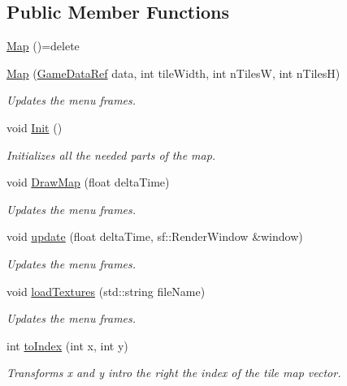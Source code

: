 \subsection*{Public Member Functions}
\begin{DoxyCompactItemize}
\item 
\mbox{\hyperlink{classMap_a7c19436c39c47715bee04c9a2390ac27}{Map}} ()=delete
\item 
\mbox{\hyperlink{classMap_a09823ddb7b00abc80dc72a4583469c58}{Map}} (\mbox{\hyperlink{Game_8h_aff850703a7797c8bfee2f02906aec50c}{Game\+Data\+Ref}} data, int tile\+Width, int n\+TilesW, int n\+TilesH)
\begin{DoxyCompactList}\small\item\em Updates the menu frames. \end{DoxyCompactList}\item 
void \mbox{\hyperlink{classMap_a67b222c575eee96246c2f3fd25b4912c}{Init}} ()
\begin{DoxyCompactList}\small\item\em Initializes all the needed parts of the map. \end{DoxyCompactList}\item 
void \mbox{\hyperlink{classMap_a3d0c3cf82f949ab01c788ab1c3e7f799}{Draw\+Map}} (float delta\+Time)
\begin{DoxyCompactList}\small\item\em Updates the menu frames. \end{DoxyCompactList}\item 
void \mbox{\hyperlink{classMap_a7346023f96a36368daa2d4cafd4523f2}{update}} (float delta\+Time, sf\+::\+Render\+Window \&window)
\begin{DoxyCompactList}\small\item\em Updates the menu frames. \end{DoxyCompactList}\item 
void \mbox{\hyperlink{classMap_a63ecd67d43e63befe38de3e438abedff}{load\+Textures}} (std\+::string file\+Name)
\begin{DoxyCompactList}\small\item\em Updates the menu frames. \end{DoxyCompactList}\item 
int \mbox{\hyperlink{classMap_a378ff701ba69cfe800693466f8f3299e}{to\+Index}} (int x, int y)
\begin{DoxyCompactList}\small\item\em Transforms x and y intro the right the index of the tile map vector. \end{DoxyCompactList}\item 

\end{DoxyCompactItemize}
